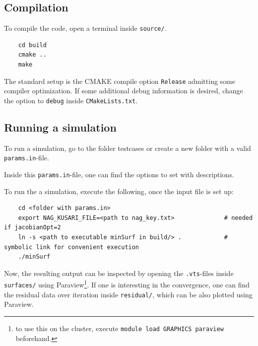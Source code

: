 \documentclass[11pt]{scrartcl}
\begin{document}
\subsection{Compilation}
To compile the code, open a terminal inside \texttt{source/}. 
\begin{lstlisting}
	cd build 
	cmake .. 
	make
\end{lstlisting}
The standard setup is the CMAKE compile option \texttt{Release} admitting some compiler optimization. If some additional debug information is desired, change the option to \texttt{debug} inside \texttt{CMakeLists.txt}.
\subsection{Running a simulation}
To run a simulation, go to the folder testcases or create a new folder with a valid \texttt{params.in}-file.

Inside this \texttt{params.in}-file, one can find the options to set with descriptions.

\noindent To run the a simulation, execute the following, once the input file is set up:
\begin{lstlisting}
	cd <folder with params.in> 
	export NAG_KUSARI_FILE=<path to nag_key.txt>              # needed if jacobianOpt=2 
	ln -s <path to executable minSurf in build/> .            # symbolic link for convenient execution 
	./minSurf
\end{lstlisting}
Now, the resulting output can be inspected by opening the \texttt{.vts}-files inside \texttt{surfaces/} using Paraview\footnote{to use this on the cluster, execute \texttt{module load GRAPHICS paraview} beforehand.}. If one is interesting in the convergence, one can find the residual data over iteration inside \texttt{residual/}, which can be also plotted using Paraview. 

\normalsize
\end{document}
